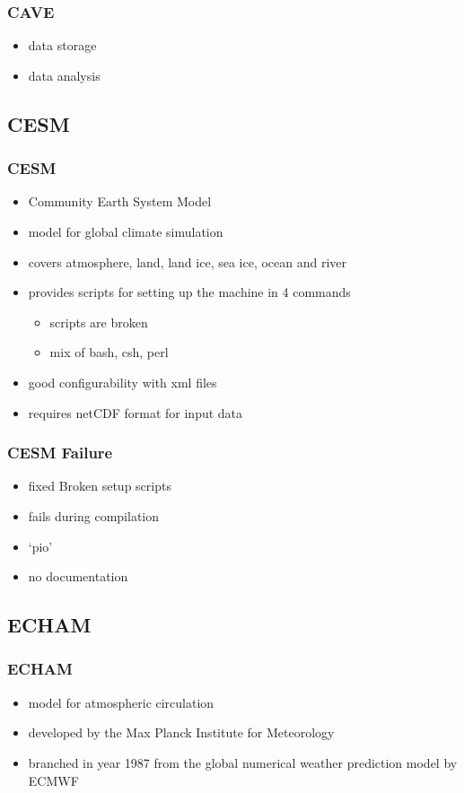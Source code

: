 \documentclass[compress]{beamer}
\begin{document}
\begin{frame}
    \frametitle{CAVE}
    \begin{itemize}
        \item data storage %
        \item data analysis %
	\end{itemize}
\end{frame}

\subsection{CESM}
\begin{frame}
    \frametitle{CESM}
    	\begin{itemize}
    	    \item Community Earth System Model
			\item model for global climate simulation
			\item covers atmosphere, land, land ice, sea ice, ocean and river
			\item provides scripts for setting up the machine in 4 commands
	    	\begin{itemize}
		    	\item scripts are broken
		    	\item mix of bash, csh, perl
		    \end{itemize}
		    \item good configurability with xml files
		    \item requires netCDF format for input data \cite{CESMDocs}
		\end{itemize}
\end{frame}

\begin{frame}
    \frametitle{CESM Failure}
    	\begin{itemize}
		    \item fixed Broken setup scripts
		    \item fails during compilation
		    \item `pio'
		    \item no documentation
		\end{itemize}
\end{frame}

\subsection{ECHAM}
\begin{frame}
	\frametitle{ECHAM}
	\begin{itemize}
		\item model for atmospheric circulation
		\item developed by the Max Planck Institute for Meteorology
		\item branched in year 1987 from the global numerical weather prediction model by ECMWF
	\end{itemize}
\end{frame}
\end{document}
